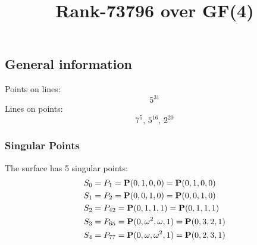 \documentclass{article}
\newcommand\setTBstruts{\def\T{\rule{0pt}{2.6ex}}%
\def\B{\rule[-1.2ex]{0pt}{0pt}}}
\newcommand{\bP}{{\bf P}}
\begin{document}
 
\setTBstruts



{\allowdisplaybreaks%






\title{Rank-73796 over GF(4)}
\author{}%
\maketitle%
%
{}



\subsection*{General information}
Points on lines:
$$
5^{31}$$
Lines on points:
$$
7^5,\,5^{16},\,2^{20}$$
\subsubsection*{Singular Points}
The surface has 5 singular points:\\
\begin{align*}
S_{0} &= P_{1}=\bP(0, 1, 0, 0) = \bP(0, 1, 0, 0)\\
S_{1} &= P_{2}=\bP(0, 0, 1, 0) = \bP(0, 0, 1, 0)\\
S_{2} &= P_{42}=\bP(0, 1, 1, 1) = \bP(0, 1, 1, 1)\\
S_{3} &= P_{65}=\bP(0, \omega^{2}, \omega , 1) = \bP(0, 3, 2, 1)\\
S_{4} &= P_{77}=\bP(0, \omega , \omega^{2}, 1) = \bP(0, 2, 3, 1)\\
\end{align*}
}
\end{document}
